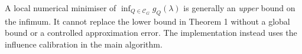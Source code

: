 A local numerical minimiser of $\inf_{Q\in\mathcal C_G}g_Q(\lambda)$ is generally an \emph{upper} bound on the infimum. It cannot replace the lower bound in Theorem 1 without a global bound or a controlled approximation error. The implementation instead uses the influence calibration in the main algorithm.
